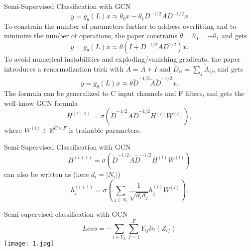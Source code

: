 \documentclass{beamer}
\begin{document}
		\begin{frame}{Semi-Supervised Classification with GCN}
			\[
			y=g_\theta(L)x \approx \theta_0x - \theta_1D^{-1/2}AD^{-1/2}x
			\]
			To constrain the number of parameters further to address overfitting and to minimize the number of operations, the paper constrains $\theta = \theta_0 = -\theta_1$ and gets
			\[
			y=g_\theta(L)x \approx \theta(I+D^{-1/2}AD^{1/2})x.
			\]
			To avoid numerical instabilities and exploding/vanishing gradients, the paper introduces a renormalization trick with $\tilde{A} = A + I$ and $\tilde{D}_{ii} = \sum_{j}\tilde{A}_{ij}$, and gets
			\[
			y=g_\theta(L)x \approx \theta \tilde{D}^{-1/2}\tilde{A}\tilde{D}^{-1/2}x.
			\]
			The formula can be generalized to C input channels and F filters, and gets the well-know GCN formula
			\[
			H^{(l+1)} = \sigma(\tilde{D}^{-1/2}\tilde{A}\tilde{D}^{-1/2}H^{(l)}W^{(l)}),
			\]
			where $W^{(l)} \in \mathbb{R}^{C\times F}$ is trainable parameters.
		\end{frame}
		\begin{frame}{Semi-Supervised Classification with GCN}
			\[
			H^{(l+1)} = \sigma(\tilde{D}^{-1/2}\tilde{A}\tilde{D}^{-1/2}H^{(l)}W^{(l)})
			\]
			can also be written as (here $d_i=|N_i|$)
			\[
			h_i^{(l+1)} = \sigma(\sum_{j \in N_i}\frac{1}{\sqrt{d_id_j}}h_j^{(l)}W^{(l)}).
			\]
		\end{frame}
		\begin{frame}{Semi-supervised classification with GCN}
			\[
			Loss=-\sum_{l \in Y_L}\sum_{f=1}^{F} Y_{lf}ln(Z_{lf})
			\]
			\texttt{[image: 1.jpg]}
		\end{frame}
	
\end{document}

